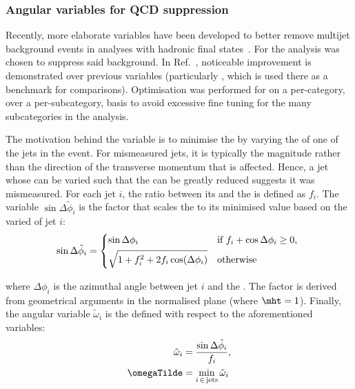 

\subsubsection{Angular variables for QCD suppression}
\label{subsubsec:htoinv_ang_var_optimisation}

Recently, more elaborate variables have been developed to better remove multijet background events in analyses with hadronic final states~\cite{Sakuma:2018xrq}. For the analysis \omegaTilde was chosen to suppress said background. In Ref.~, noticeable improvement is demonstrated over previous variables (particularly \biasedDPhi, which is used there as a benchmark for comparisons). Optimisation was performed for \omegaTilde on a per-category, over a per-subcategory, basis to avoid excessive fine tuning for the many subcategories in the analysis.

The motivation behind the variable \omegaTilde is to minimise the \mht by varying the \pt of one of the \glspl{jet} in the event. For mismeasured \glspl{jet}, it is typically the magnitude rather than the direction of the transverse momentum that is affected. Hence, a \gls{jet} whose \pt can be varied such that the \mht can be greatly reduced suggests it was mismeasured. For each jet $i$, the ratio between its \pt and the \mht is defined as $f_i$. The variable $\sin\Delta\tilde{\phi}_i$ is the factor that scales the \mht to its minimised value based on the varied \pt of jet $i$:
\begin{align}
\sin\Delta\tilde{\phi}_i = \begin{dcases*}
\sin\Delta\phi_i & if $f_i + \cos\Delta\phi_i \geq 0$, \\
\sqrt{1 + f_i^2 + 2 f_i \cos(\Delta\phi_i)} & otherwise\\
\end{dcases*}
\end{align}

where $\Delta\phi_i$ is the azimuthal angle between \gls{jet} $i$ and the \htvecmiss. The factor is derived from geometrical arguments in the normalised \pt plane (where $\mht = \text{1}$). Finally, the angular variable $\tilde{\omega}_i$ is the defined with respect to the aforementioned variables:
\begin{equation}
    \begin{aligned}
\tilde{\omega}_i &= \frac{ \sin\Delta\tilde{\phi}_i }{ f_i },\\
\omegaTilde &= \min_{i \, \in \, \mathrm{jets}} \tilde{\omega}_i
    \end{aligned}
\end{equation}

